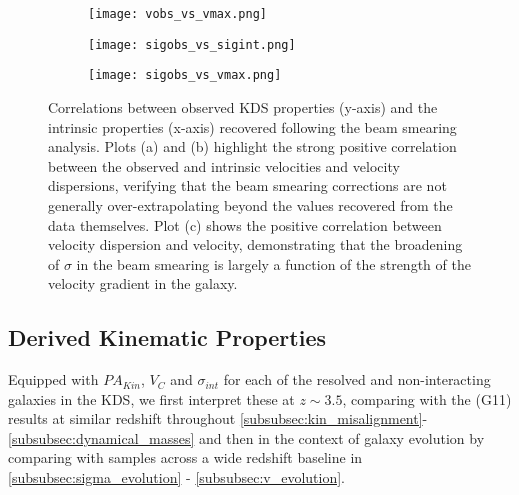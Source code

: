 \documentclass[fleqn,usenatbib]{mn2e}
\begin{document}
\begin{figure*}
    \centering
    \begin{subfigure}[h!]{0.32\textwidth}
        \centering
        \texttt{[image: vobs\_vs\_vmax.png]}
    \end{subfigure}%
    \begin{subfigure}[h!]{0.32\textwidth}
        \centering
        \texttt{[image: sigobs\_vs\_sigint.png]}
    \end{subfigure}
    \begin{subfigure}[h!]{0.32\textwidth}
        \centering
        \texttt{[image: sigobs\_vs\_vmax.png]}
    \end{subfigure}
    \caption{Correlations between observed KDS properties (y-axis) and the intrinsic properties (x-axis) recovered following the beam smearing analysis.
    Plots (a) and (b) highlight the strong positive correlation between the observed and intrinsic velocities and velocity dispersions, verifying that the beam smearing corrections are not generally over-extrapolating beyond the values recovered from the data themselves.
    Plot (c) shows the positive correlation between velocity dispersion and velocity, demonstrating that the broadening of $\sigma$ in the beam smearing is largely a function of the strength of the velocity gradient in the galaxy.}
    \label{fig:observed_and_intrinsic}
\end{figure*}

\subsection{Derived Kinematic Properties}
Equipped with $PA_{Kin}$, $V_{C}$ and $\sigma_{int}$ for each of the resolved and non-interacting galaxies in the KDS, we first interpret these at $z \sim 3.5$, comparing with the \cite{Gnerucci2011} (G11) results at similar redshift throughout \cref{subsubsec:kin_misalignment}-\cref{subsubsec:dynamical_masses} and then in the context of galaxy evolution by comparing with samples across a wide redshift baseline in \cref{subsubsec:sigma_evolution} - \cref{subsubsec:v_evolution}.
\end{document}
